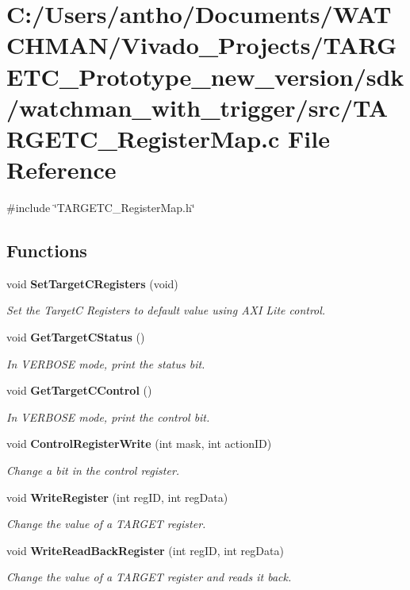\section{C\+:/\+Users/antho/\+Documents/\+W\+A\+T\+C\+H\+M\+A\+N/\+Vivado\+\_\+\+Projects/\+T\+A\+R\+G\+E\+T\+C\+\_\+\+Prototype\+\_\+new\+\_\+version/sdk/watchman\+\_\+with\+\_\+trigger/src/\+T\+A\+R\+G\+E\+T\+C\+\_\+\+Register\+Map.c File Reference}
\label{_t_a_r_g_e_t_c___register_map_8c}
{\ttfamily \#include \char`\"{}T\+A\+R\+G\+E\+T\+C\+\_\+\+Register\+Map.\+h\char`\"{}}\newline
\subsection*{Functions}
\begin{DoxyCompactItemize}
\item 
void \textbf{ Set\+Target\+C\+Registers} (void)
\begin{DoxyCompactList}\small\item\em Set the TargetC Registers to default value using A\+XI Lite control. \end{DoxyCompactList}\item 
void \textbf{ Get\+Target\+C\+Status} ()
\begin{DoxyCompactList}\small\item\em In V\+E\+R\+B\+O\+SE mode, print the status bit. \end{DoxyCompactList}\item 
void \textbf{ Get\+Target\+C\+Control} ()
\begin{DoxyCompactList}\small\item\em In V\+E\+R\+B\+O\+SE mode, print the control bit. \end{DoxyCompactList}\item 
void \textbf{ Control\+Register\+Write} (int mask, int action\+ID)
\begin{DoxyCompactList}\small\item\em Change a bit in the control register. \end{DoxyCompactList}\item 
void \textbf{ Write\+Register} (int reg\+ID, int reg\+Data)
\begin{DoxyCompactList}\small\item\em Change the value of a T\+A\+R\+G\+ET register. \end{DoxyCompactList}\item 
void \textbf{ Write\+Read\+Back\+Register} (int reg\+ID, int reg\+Data)
\begin{DoxyCompactList}\small\item\em Change the value of a T\+A\+R\+G\+ET register and reads it back. \end{DoxyCompactList}\end{DoxyCompactItemize}
